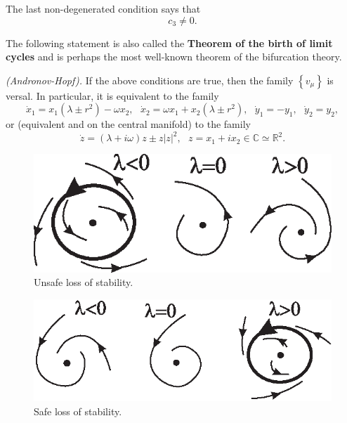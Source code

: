 The last non-degenerated condition says that
$$
c_{3}\not=0.
$$

The following statement is also called the \textbf{Theorem of the birth of limit cycles} and is perhaps the most well-known theorem of the bifurcation theory.

\begin{theorem}\emph{(Andronov-Hopf).}\label{theo:3.36}
	If the above conditions are true, then the family $\left\{ v_{\mu }\right\} $ is versal. In particular, it is equivalent to the family
	$$
	\dot{x}_{1}=x_{1}(\lambda \pm r^{2})-\omega x_{2},\text{ \ \ }\dot{x}%
	_{2}=\omega x_{1}+x_{2}(\lambda \pm r^{2}),\text{ \ }\dot{y}_{1}=-y_{1},%
	\text{\ \ }\dot{y}_{2}=y_{2},
	$$
	or (equivalent and on the central manifold) to the family
	\begin{equation}
	\label{3.10}
	\dot{z}=(\lambda +i\omega )z\pm z\left\vert z\right\vert ^{2},\text{ \ \ \ }%
	z=x_{1}+ix_{2}\in \mathbb{C}\simeq \mathbb{R}^{2}.
	\end{equation}
\end{theorem}

\begin{figure}[!ht]
	\centering
	\includegraphics [scale=1.4]{jtr312}
	\caption{Unsafe loss of stability.}
	\label{fig:3.12}
\end{figure}

\begin{figure}[!ht]
	\centering
	\includegraphics [scale=1.4]{jtr313}
	\caption{Safe loss of stability.}
	\label{fig:3.13}
\end{figure}

